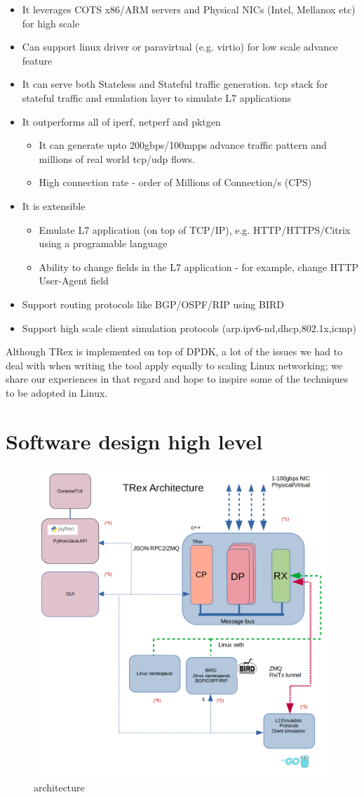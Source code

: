 \documentclass[conference]{IEEEtran}
\begin{document}
\begin{itemize}
\item It leverages COTS x86/ARM servers and Physical NICs (Intel, Mellanox etc) for high scale 
\item Can support linux driver or paravirtual (e.g. virtio) for low scale advance feature 
\item  It can serve both Stateless and Stateful traffic generation.
  tcp stack for stateful traffic and emulation layer to simulate L7 applications
\item It outperforms all of iperf, netperf and pktgen 
   \begin{itemize}
    \item It can generate upto 200gbps/100mpps advance traffic pattern and millions of real
      world tcp/udp flows.
    \item High connection rate - order of Millions of Connection/s (CPS)
  \end{itemize}
\item It is extensible
\begin{itemize}
    \item Emulate L7 application (on top of TCP/IP),
       e.g. HTTP/HTTPS/Citrix using a programable language
    \item Ability to change fields in the L7 application - for example,
      change HTTP User-Agent field
\end{itemize}
\item Support routing protocols like BGP/OSPF/RIP using BIRD \cite{b4}
\item Support high scale client simulation protocols (arp.ipv6-nd,dhcp,802.1x,icmp) 
\end{itemize}
Although TRex is implemented on top of DPDK, a lot of the issues we had
to deal with when writing the tool apply equally to scaling Linux networking;
we share our experiences in that regard and hope to inspire some
of the techniques to be adopted in Linux.

\section{Software design high level}

\begin{figure}[h]
\includegraphics[width=0.4
\textwidth, center]{trex_arch_2.png}
\caption{architecture}
\label{fig:arch}
\end{figure}
\end{document}
